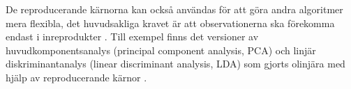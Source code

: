 \documentclass[a4paper, 12pt]{report}
\theoremstyle{definition}
\theoremstyle{remark}
\begin{document}
De reproducerande kärnorna kan också användas för att göra andra algoritmer mera flexibla, det huvudsakliga kravet är att observationerna ska förekomma endast i inreprodukter \cite{ESL, LearningKernels}. Till exempel finns det versioner av huvudkomponentsanalys (principal component analysis, PCA) och linjär diskriminantanalys (linear discriminant analysis, LDA) som gjorts olinjära med hjälp av reproducerande kärnor \cite{ESL}.



\end{document}
